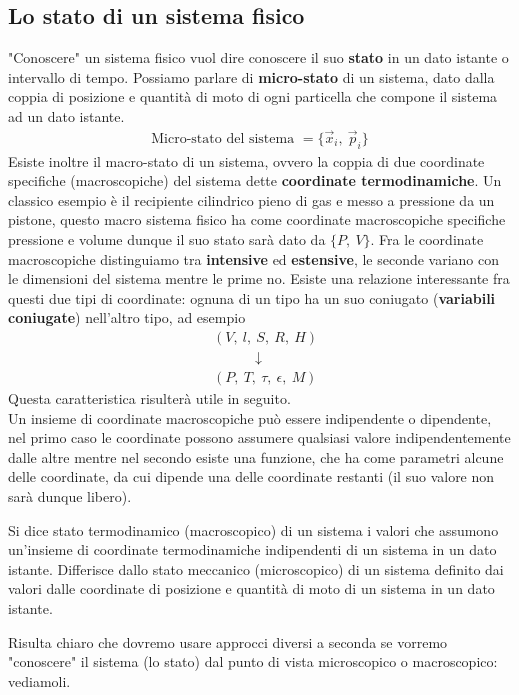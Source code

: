 \documentclass[
10pt, %
a4paper, %
oneside, %
headinclude,footinclude, %
BCOR5mm, %
]{scrartcl}
\begin{document}
\subsection{Lo stato di un sistema fisico}
"Conoscere" un sistema fisico vuol dire conoscere il suo \textbf{stato} in un dato istante o intervallo di tempo.
Possiamo parlare di \textbf{micro-stato} di un sistema, dato dalla coppia di posizione e quantità di moto di ogni particella che compone il sistema ad un dato istante. 
\begin{align*} 
	\text{Micro-stato del sistema } = \{ \vec{x}_i,\ \vec{p}_i\}
\end{align*} 
Esiste inoltre il macro-stato di un sistema, ovvero la coppia di due coordinate specifiche (macroscopiche) del sistema dette \textbf{coordinate termodinamiche}. Un classico esempio è il recipiente cilindrico pieno di gas e messo a pressione da un pistone, questo macro sistema fisico ha come coordinate macroscopiche specifiche pressione e volume dunque il suo stato sarà dato da $\{P,\ V\}$. Fra le coordinate macroscopiche distinguiamo tra \textbf{intensive} ed \textbf{estensive}, le seconde variano con le dimensioni del sistema mentre le prime no. Esiste una relazione interessante fra questi due tipi di coordinate: ognuna di un tipo ha un suo coniugato (\textbf{variabili coniugate}) nell'altro tipo, ad esempio 
\begin{align*} 
	&(V,\ l ,\ S,\ R,\ H)\\
	&\quad \quad \quad \downarrow\\
	&(P,\ T,\ \tau,\ \epsilon,\ M)
\end{align*} 
Questa caratteristica risulterà utile in seguito.\\
Un insieme di coordinate macroscopiche può essere indipendente o dipendente, nel primo caso le coordinate possono assumere qualsiasi valore indipendentemente dalle altre mentre nel secondo esiste una funzione, che ha come parametri alcune delle coordinate, da cui dipende una delle coordinate restanti (il suo valore non sarà dunque libero). 
\begin{definition}
	Si dice stato termodinamico (macroscopico) di un sistema i valori che assumono un'insieme di coordinate termodinamiche indipendenti di un sistema in un dato istante. Differisce dallo stato meccanico (microscopico) di un sistema definito dai valori dalle coordinate di posizione e quantità di moto di un sistema in un dato istante. 
\end{definition}
Risulta chiaro che dovremo usare approcci diversi a seconda se vorremo "conoscere" il sistema (lo stato) dal punto di vista microscopico o macroscopico: vediamoli. 
\end{document}
